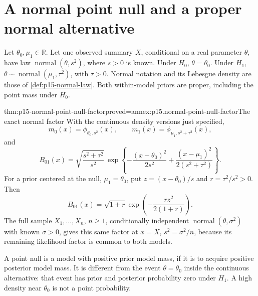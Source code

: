 \section{A normal point null and a proper normal alternative}
\label{sec:p15-normal-bayes-factor}

Let \(\theta_0,\mu_1\in\mathbb R\). Let one observed summary \(X\),
conditional on a real parameter \(\theta\), have law
\(\operatorname{normal}(\theta,s^2)\), where \(s>0\) is known.
Under \(H_0\), \(\theta=\theta_0\). Under \(H_1\),
\(\theta\sim\operatorname{normal}(\mu_1,\tau^2)\), with \(\tau>0\).
Normal notation and its Lebesgue density are those of
\cref{def:p15-normal-law}. Both within-model priors are proper, including
the point mass under \(H_0\).

\begin{hbtheorem}{thm:p15-normal-point-null-factor}{proved=annex:p15.normal-point-null-factor}{The exact normal factor}
With the continuous density versions just specified,
\[
 m_0(x)=\phi_{\theta_0,s^2}(x),\qquad
 m_1(x)=\phi_{\mu_1,s^2+\tau^2}(x),
\]
and
\[
 B_{01}(x)=
 \sqrt{\frac{s^2+\tau^2}{s^2}}\,
 \exp\!\left\{-\frac{(x-\theta_0)^2}{2s^2}
             +\frac{(x-\mu_1)^2}{2(s^2+\tau^2)}\right\}.
\]
For a prior centered at the null, \(\mu_1=\theta_0\), put
\(z=(x-\theta_0)/s\) and \(r=\tau^2/s^2>0\). Then
\[
 B_{01}(x)=\sqrt{1+r}\exp\!\left(-\frac{rz^2}{2(1+r)}\right).
\]
The full sample \(X_1,\ldots,X_n\), \(n\geq1\), conditionally independent
\(\operatorname{normal}(\theta,\sigma^2)\) with known \(\sigma>0\),
gives this same factor at \(x=\bar X\), \(s^2=\sigma^2/n\), because
its remaining likelihood factor is common to both models.
\end{hbtheorem}

A point null is a model with positive prior model mass, if it is to acquire
positive posterior model mass. It is different from the event
\(\theta=\theta_0\) inside the continuous alternative: that event has prior
and posterior probability zero under \(H_1\). A high density near
\(\theta_0\) is not a point probability.


